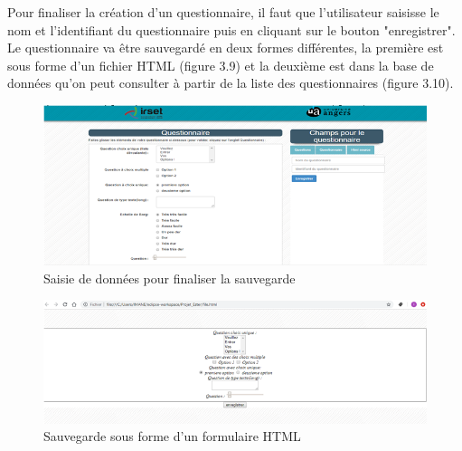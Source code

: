 Pour finaliser la création d’un questionnaire, il faut que l’utilisateur saisisse le nom et l’identifiant du questionnaire puis en cliquant sur le bouton "enregistrer". Le questionnaire va être sauvegardé en deux formes différentes, la première est sous forme d’un fichier HTML (figure 3.9) et la deuxième est dans la base de données qu’on peut consulter à partir de la liste des questionnaires (figure 3.10).


\begin{figure}[H]
    \begin{center}
	\includegraphics[scale=0.7]{img/questionnaire/enregistrement}
    \end{center}
    \caption{Saisie de données pour finaliser la sauvegarde}
\end{figure}


\begin{figure}[H]
    \begin{center}
	\includegraphics[scale=0.7]{img/questionnaire/fichier}
    \end{center}
    \caption{Sauvegarde sous forme d'un formulaire HTML}
\end{figure}

